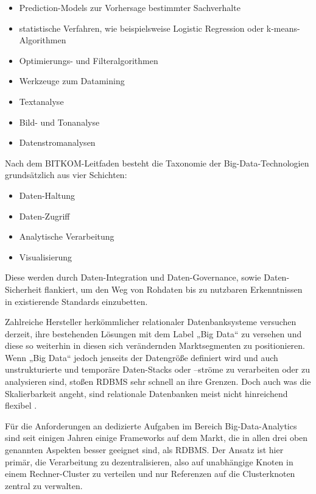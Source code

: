 \begin{itemize}
		\item Prediction-Models zur Vorhersage bestimmter Sachverhalte
		\item statistische Verfahren, wie beispielsweise Logistic Regression oder k-means-Algorithmen 
		\item Optimierungs- und Filteralgorithmen 
		\item Werkzeuge zum Datamining
		\item Textanalyse
		\item Bild- und Tonanalyse
		\item Datenstromanalysen
\end{itemize}	



Nach dem BITKOM-Leitfaden  besteht die Taxonomie der Big-Data-Technologien grundsätzlich aus vier Schichten:


\begin{itemize}
		\item Daten-Haltung
		\item Daten-Zugriff 
		\item Analytische Verarbeitung
		\item Visualisierung
\end{itemize}	


Diese werden durch Daten-Integration und Daten-Governance, sowie Daten-Sicherheit flankiert, um den Weg von Rohdaten bis zu nutzbaren Erkenntnissen in existierende Standards einzubetten.

Zahlreiche Hersteller herkömmlicher relationaler Datenbanksysteme versuchen derzeit, ihre bestehenden Lösungen mit dem Label „Big Data“ zu versehen und diese so weiterhin in diesen sich verändernden Marktsegmenten zu positionieren. Wenn „Big Data“ jedoch jenseits der Datengröße definiert wird und auch unstrukturierte und temporäre Daten-Stacks oder –ströme zu verarbeiten oder zu analysieren sind, stoßen RDBMS sehr schnell an ihre Grenzen. Doch auch was die Skalierbarkeit angeht, sind relationale Datenbanken meist nicht hinreichend flexibel . 

Für die Anforderungen an dedizierte Aufgaben im Bereich Big-Data-Analytics sind seit einigen Jahren einige Frameworks auf dem Markt, die in allen drei oben genannten Aspekten besser geeignet sind, als RDBMS. Der Ansatz ist hier primär, die Verarbeitung zu dezentralisieren, also auf unabhängige Knoten in einem Rechner-Cluster zu verteilen und nur Referenzen auf die Clusterknoten zentral zu verwalten.  

